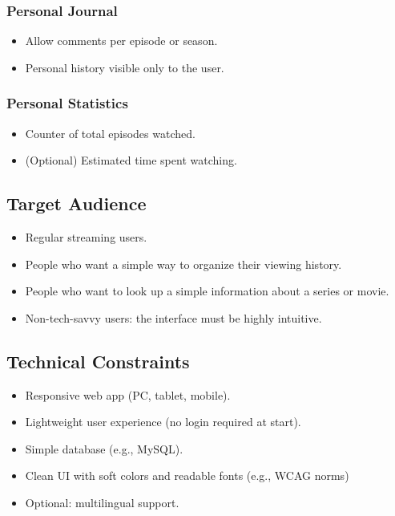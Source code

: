 \subsubsection{Personal Journal}
\begin{itemize}
    \item Allow comments per episode or season.
    \item Personal history visible only to the user.
\end{itemize}

\subsubsection{Personal Statistics}
\begin{itemize}
    \item Counter of total episodes watched.
    \item (Optional) Estimated time spent watching.
\end{itemize}

\subsection{Target Audience}
\begin{itemize}
    \item Regular streaming users.
    \item People who want a simple way to organize their viewing history.
    \item People who want to look up a simple information about a series or movie.
    \item Non-tech-savvy users: the interface must be highly intuitive.
\end{itemize}

\subsection{Technical Constraints}
\begin{itemize}
    \item Responsive web app (PC, tablet, mobile).
    \item Lightweight user experience (no login required at start).
    \item Simple database (e.g., MySQL).
    \item Clean UI with soft colors and readable fonts (e.g., WCAG norms)
    \item Optional: multilingual support.
\end{itemize}

